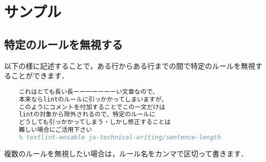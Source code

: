 \documentclass[main]{subfiles}
\begin{document}
\section{サンプル}

\subsection{特定のルールを無視する}

以下の様に記述することで，ある行からある行までの間で特定のルールを無視することができます．

\begin{lstlisting}[caption=textlint-filter-rule-commentsの使用方法,language=tex,breaklines=true]
    % textlint-disable ja-technical-writing/sentence-length
    これはとても長い長ーーーーーーーい文章なので、
    本来ならlintのルールに引っかかってしまいますが、
    このようにコメントを付加することでこの一文だけは
    lintの対象から除外されるので、特定のルールに
    どうしても引っかかってしまう・しかし修正することは
    難しい場合にご活用下さい
    % textlint-ensable ja-technical-writing/sentence-length
\end{lstlisting}

複数のルールを無視したい場合は，ルール名をカンマで区切って書きます．
\end{document}
